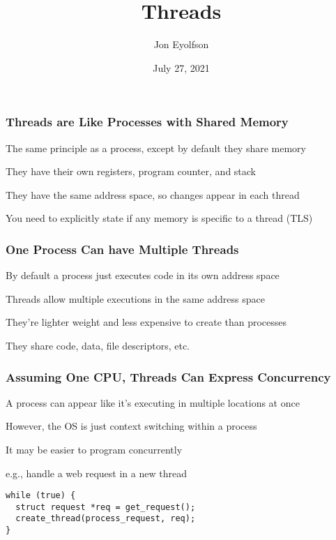 

\title{Threads}
\author{Jon Eyolfson}
\date{July 27, 2021}


  \begin{frame}
    \titlepage
  \end{frame}

  \begin{frame}
    \frametitle{Threads are Like Processes with Shared Memory}

    The same principle as a process, except by default they share memory

    \hspace{2em} They have their own registers, program counter, and stack

    \vspace{2em}

    They have the same address space, so changes appear in each thread

    \vspace{2em}

    You need to explicitly state if any memory is specific to a thread (TLS)
  \end{frame}

  \begin{frame}
    \frametitle{One Process Can have Multiple Threads}

    By default a process just executes code in its own address space

    \vspace{2em}

    Threads allow multiple executions in the same address space

    \vspace{2em}

    They're lighter weight and less expensive to create than processes

    \hspace{2em} They share code, data, file descriptors, etc.
  \end{frame}

  \begin{frame}[fragile]
    \frametitle{Assuming One CPU, Threads Can Express Concurrency}

    A process can appear like it's executing in multiple locations at once

    \hspace{2em} However, the OS is just context switching within a process

    \vspace{2em}

    It may be easier to program concurrently

    \hspace{2em} e.g., handle a web request in a new thread

    \vspace{2em}

    \begin{lstlisting}
while (true) {
  struct request *req = get_request();
  create_thread(process_request, req);
}
    \end{lstlisting}
  \end{frame}

